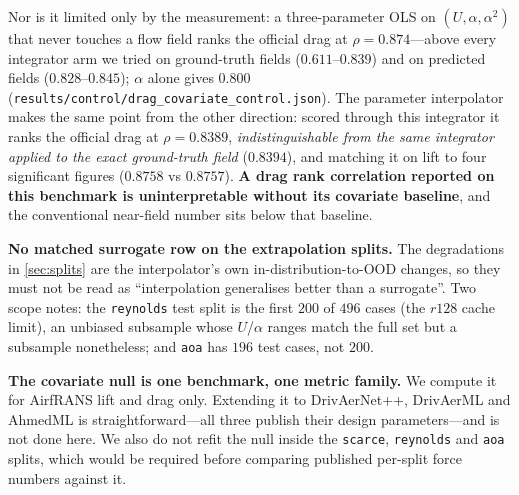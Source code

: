 
Nor is it limited only by
the measurement: a three-parameter OLS on $(U,\alpha,\alpha^2)$ that never touches a flow
field ranks the official drag at $\rho=0.874$---above every integrator arm we tried on
ground-truth fields ($0.611$--$0.839$) and on predicted fields
($0.828$--$0.845$); $\alpha$ alone gives $0.800$
(\texttt{results/control/drag\_covariate\_control.json}). The parameter interpolator makes
the same point from the other direction: scored through this integrator it ranks the
official drag at $\rho=0.8389$, \emph{indistinguishable from the same integrator applied
to the exact ground-truth field} ($0.8394$), and matching it on lift to four significant
figures ($0.8758$ vs $0.8757$). \textbf{A drag rank correlation reported on this benchmark
is uninterpretable without its covariate baseline}, and the conventional near-field number
sits below that baseline.



\item \textbf{No matched surrogate row on the extrapolation splits.} The degradations in
\autoref{sec:splits} are the interpolator's own in-distribution-to-OOD changes, so they
must not be read as ``interpolation generalises better than a surrogate''. Two scope notes:
the \texttt{reynolds} test split is the first $200$ of $496$ cases (the $r128$ cache
limit), an unbiased subsample whose $U$/$\alpha$ ranges match the full set but a subsample
nonetheless; and \texttt{aoa} has $196$ test cases, not $200$.

\item \textbf{The covariate null is one benchmark, one metric family.} We compute it for
AirfRANS lift and drag only. Extending it to DrivAerNet++, DrivAerML and AhmedML is
straightforward---all three publish their design parameters---and is not done here. We also
do not refit the null inside the \texttt{scarce}, \texttt{reynolds} and \texttt{aoa}
splits, which would be required before comparing published per-split force numbers against
it.


